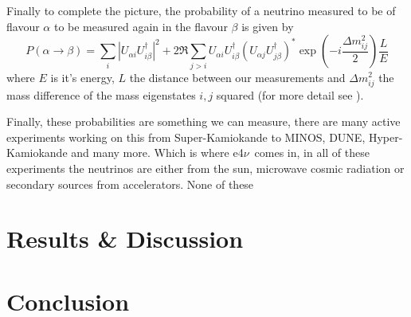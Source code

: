 \documentclass[a4paper,12pt]{article}
\newcommand{\efn}{e4$\nu$}
\begin{document}
Finally to complete the picture, the probability of a neutrino measured to be of flavour $\alpha$ to be measured again in the flavour $\beta$ is given by 
\begin{equation}
    P(\alpha \rightarrow \beta) = \sum_i |U_{\alpha i} U^\dag_{i \beta}|^2 + 2\Re \sum_{j>i} U_{\alpha i} U^\dag_{i \beta} (U_{\alpha j} U^\dag_{j \beta})^* \exp(-i\frac{\Delta m^2_{ij}}{2})\frac{L}{E}
\end{equation}
where $E$ is it's energy, $L$ the distance between our measurements and $\Delta m^2_{ij}$ the mass difference of the mass eigenstates $i, j$ squared (for more detail see \cite{zuberNeutrinoPhysics2020}).

Finally, these probabilities are something we can measure, there are many active experiments working on this  from Super-Kamiokande to MINOS, DUNE, Hyper-Kamiokande and many more.
Which is where \efn\ comes in, in all of these experiments the neutrinos are either from the sun, microwave cosmic radiation or secondary sources from accelerators\cite{zuberNeutrinoPhysics2020}.
None of these 



\newpage


\section{Results \& Discussion}

\section{Conclusion}

\printbibliography
\end{document}
